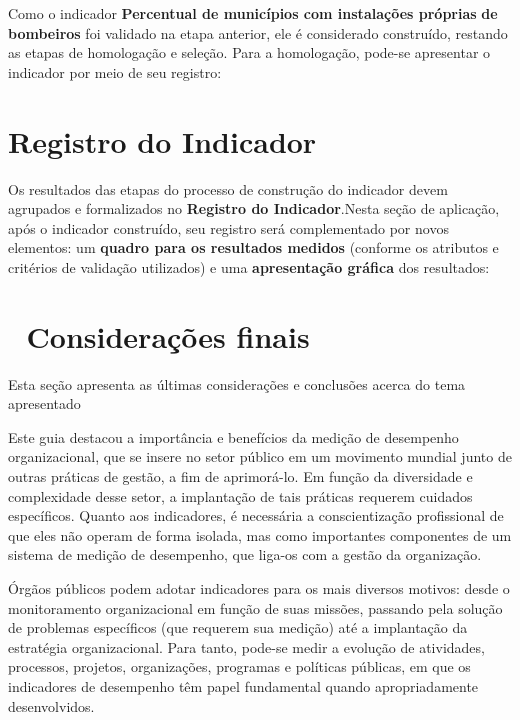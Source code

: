 \documentclass[
  letterpaper,
  DIV=11,
  numbers=noendperiod]{scrreprt}
\begin{document}

Como o indicador \textbf{Percentual de municípios com instalações
próprias} \textbf{de bombeiros} foi validado na etapa anterior, ele é
considerado construído, restando as etapas de homologação e seleção.
Para a homologação, pode-se apresentar o indicador por meio de seu
registro:

\hypertarget{registro-do-indicador}{%
\chapter*{Registro do Indicador}\label{registro-do-indicador}}


Os resultados das etapas do processo de construção do indicador devem
agrupados e formalizados no \textbf{Registro do Indicador}.Nesta seção
de aplicação, após o indicador construído, seu registro será
complementado por novos elementos: um \textbf{quadro para os resultados
medidos} (conforme os atributos e critérios de validação utilizados) e
uma \textbf{apresentação gráfica} dos resultados:


\hypertarget{considerauxe7uxf5es-finais}{%
\chapter*{📝 Considerações finais}\label{considerauxe7uxf5es-finais}}


{Esta seção apresenta as últimas considerações e conclusões acerca do
tema apresentado}

Este guia destacou a importância e benefícios da medição de desempenho
organizacional, que se insere no setor público em um movimento mundial
junto de outras práticas de gestão, a fim de aprimorá-lo. Em função da
diversidade e complexidade desse setor, a implantação de tais práticas
requerem cuidados específicos. Quanto aos indicadores, é necessária a
conscientização profissional de que eles não operam de forma isolada,
mas como importantes componentes de um sistema de medição de desempenho,
que liga-os com a gestão da organização.

Órgãos públicos podem adotar indicadores para os mais diversos motivos:
desde o monitoramento organizacional em função de suas missões, passando
pela solução de problemas específicos (que requerem sua medição) até a
implantação da estratégia organizacional. Para tanto, pode-se medir a
evolução de atividades, processos, projetos, organizações, programas e
políticas públicas, em que os indicadores de desempenho têm papel
fundamental quando apropriadamente desenvolvidos.
\end{document}
